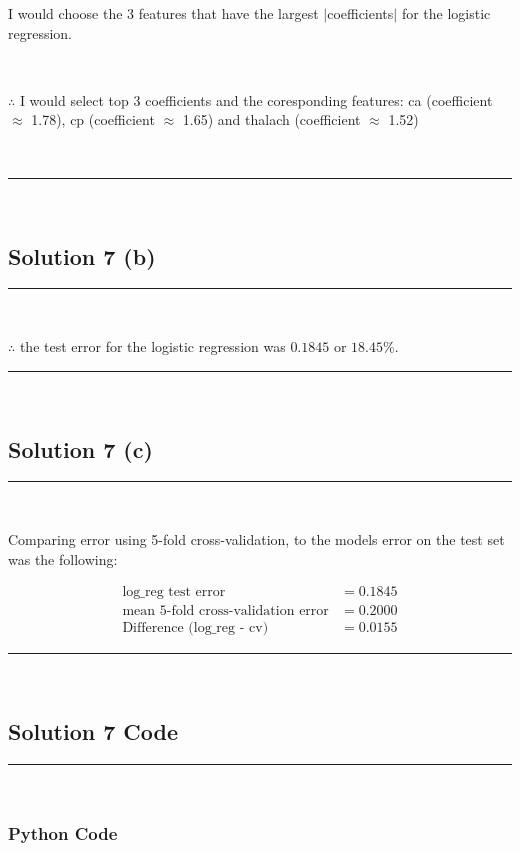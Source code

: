\documentclass{article}
\begin{document}
\parbox{\textwidth}{
I would choose the 3 features that have the largest $|$coefficients$|$ for the logistic regression.
}\\

\parbox{\textwidth}{
$\therefore$ I would select
top 3 coefficients and the coresponding features: ca (coefficient $\approx$ 1.78), cp (coefficient $\approx$ 1.65) and thalach (coefficient $\approx$ 1.52)
}\\

\noindent\rule{\textwidth}{0.4pt}\\

\newpage

\subsection*{Solution 7 (b)}
\noindent\rule{\textwidth}{0.4pt}\\

\parbox{\textwidth}{
$\therefore$ the test error for the logistic regression was $0.1845$ or $18.45\%$. 
}

\noindent\rule{\textwidth}{0.4pt}\\

\newpage

\subsection*{Solution 7 (c)}
\noindent\rule{\textwidth}{0.4pt}\\

\parbox{\textwidth}{
Comparing error using 5-fold cross-validation, to the models error on the test set was the following:
}
\begin{align*}
  \text{log\_reg test error} &= 0.1845 \\
  \text{mean 5-fold cross-validation error} &= 0.2000 \\
  \text{Difference (log\_reg - cv)} &= 0.0155
\end{align*}

\noindent\rule{\textwidth}{0.4pt}\\

\newpage

\subsection*{Solution 7 Code}
\noindent\rule{\textwidth}{0.4pt}\\

\subsubsection*{Python Code}
\end{document}
